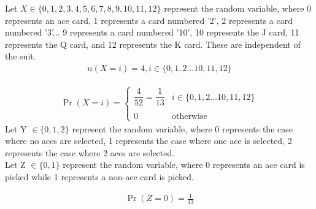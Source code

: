 
Let $X \in \{0,1,2,3,4,5,6,7,8,9,10,11,12\}$ represent the random variable, where 0 represents an ace card, 1 represents a card numbered '2', 2 represents a card numbered '3'... 9 represents a card numbered '10', 10 represents the J card, 11 represents the Q card, and 12 represents the K card. These are independent of the suit. 
\begin{align}
    n(X=i) = 4, i \in \{0, 1, 2\hdots 10, 11, 12\}
\end{align}

\begin{align}
    \Pr(X=i) = 
	\begin{cases}
	\dfrac{4}{52} = \dfrac{1}{13} &  i \in \{0, 1, 2\hdots 10, 11, 12\}\\ ~\\[-1em]
	0 & \text{otherwise}
	\end{cases}
\end{align}
Let Y $\in \{0,1,2\}$ represent the random variable, where 0 represents the case where no aces are selected, 1 represents the case where one ace is selected, 2 represents the case where 2 aces are selected.
\\Let Z $\in \{0,1\}$ represent the random variable, where 0 represents an ace card is picked while 1 represents a non-ace card is picked.

\begin{align}
    \Pr(Z=0) = \frac{1}{13}
\end{align}

